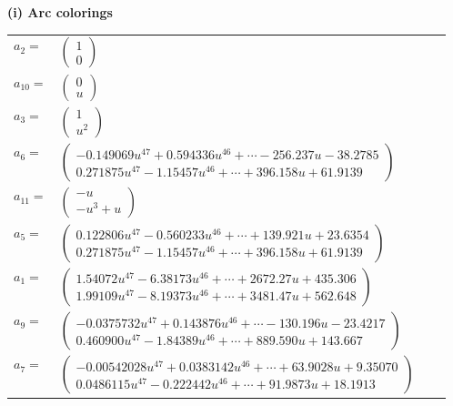 \documentclass[1p]{elsarticle_modified}
\theoremstyle{definition}
\begin{document}
\flushleft \textbf{(i) Arc colorings}\\
\begin{tabular}{m{7pt} m{180pt} m{7pt} m{180pt} }
\flushright $a_{2}=$&$\begin{pmatrix}1\\0\end{pmatrix}$ \\
\flushright $a_{10}=$&$\begin{pmatrix}0\\u\end{pmatrix}$ \\
\flushright $a_{3}=$&$\begin{pmatrix}1\\u^2\end{pmatrix}$ \\
\flushright $a_{6}=$&$\begin{pmatrix}-0.149069 u^{47}+0.594336 u^{46}+\cdots-256.237 u-38.2785\\0.271875 u^{47}-1.15457 u^{46}+\cdots+396.158 u+61.9139\end{pmatrix}$ \\
\flushright $a_{11}=$&$\begin{pmatrix}- u\\- u^3+u\end{pmatrix}$ \\
\flushright $a_{5}=$&$\begin{pmatrix}0.122806 u^{47}-0.560233 u^{46}+\cdots+139.921 u+23.6354\\0.271875 u^{47}-1.15457 u^{46}+\cdots+396.158 u+61.9139\end{pmatrix}$ \\
\flushright $a_{1}=$&$\begin{pmatrix}1.54072 u^{47}-6.38173 u^{46}+\cdots+2672.27 u+435.306\\1.99109 u^{47}-8.19373 u^{46}+\cdots+3481.47 u+562.648\end{pmatrix}$ \\
\flushright $a_{9}=$&$\begin{pmatrix}-0.0375732 u^{47}+0.143876 u^{46}+\cdots-130.196 u-23.4217\\0.460900 u^{47}-1.84389 u^{46}+\cdots+889.590 u+143.667\end{pmatrix}$ \\
\flushright $a_{7}=$&$\begin{pmatrix}-0.00542028 u^{47}+0.0383142 u^{46}+\cdots+63.9028 u+9.35070\\0.0486115 u^{47}-0.222442 u^{46}+\cdots+91.9873 u+18.1913\end{pmatrix}$ \\

\end{tabular}
\end{document}
